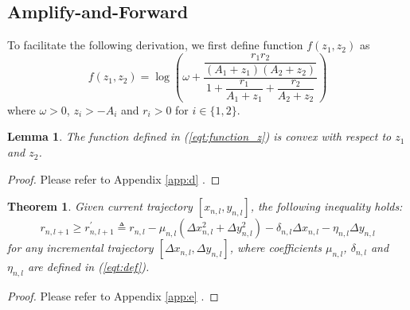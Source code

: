 \documentclass[12pt, draftclsnofoot, onecolumn]{IEEEtran}
\newtheorem{theorem}{Theorem}
\newtheorem{lemma}{Lemma}
\begin{document}
\subsection{Amplify-and-Forward} 
To facilitate the following derivation, we first define function $f(z_{1},z_{2})$ as
\begin{equation}\label{eqt:function_z}
f(z_{1},z_{2})=\log(\omega +\dfrac{\dfrac{r_{1}r_{2}}{(A_{1}+z_{1})(A_{2}+z_{2})}}{1+\dfrac{r_{1}}{A_{1}+z_{1}}+\dfrac{r_{2}}{A_{2}+z_{2}}})
\end{equation}
where $\omega >0$, $z_{i}>-A_{i}$ and $r_{i}>0$ for $i\in\{1,2\}$.

\begin{lemma}\label{lemma:convexity}
The function defined in (\ref{eqt:function_z}) is convex with respect to $z_{1}$ and $z_{2}$.
\end{lemma}

\begin{proof}
Please refer to Appendix \ref{app:d} .
\end{proof}

\begin{theorem}\label{theorem:lb_af}
Given current trajectory $[x_{n,l},y_{n,l}]$, the following inequality holds:
\begin{equation}\label{eqt:lb_af}
r_{n,l+1}\geq r^{\prime}_{n,l+1}\triangleq r_{n,l}-\mu_{n,l}(\Delta x_{n,l}^{2}+\Delta y_{n,l}^{2})-\delta_{n,l}\Delta x_{n,l}-\eta_{n,l}\Delta y_{n,l}
\end{equation}
for any incremental trajectory $[\Delta x_{n,l},\Delta y_{n,l}]$, where coefficients $\mu_{n,l}$, $\delta_{n,l}$ and $\eta_{n,l}$ are defined in (\ref{eqt:def}). 
\end{theorem}

\begin{proof}
Please refer to Appendix \ref{app:e} .
\end{proof}
\end{document}
